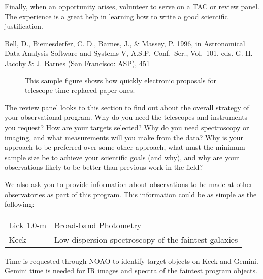 Finally, when an opportunity arises, volunteer to serve on
a TAC or review panel.  The experience is a great help in
learning how to write a good scientific justification.

\begin{references}
 Bell, D., Biemesderfer, C. D., Barnes, J., \& Massey, P. 1996, in
Astronomical Data Analysis Software and Systems V, A.S.P.\ Conf.\ Ser.,
Vol.\ 101, eds. G. H. Jacoby \& J. Barnes (San Francisco: ASP), 451
\end{references}

\begin{figure}[hbt]
\caption{This sample figure shows how quickly electronic proposals
for telescope time replaced paper ones.}
\end{figure}

\clearpage


%

%

\expdesign
The review panel looks to this section to find out about the overall
strategy of your observational program.  Why do you need the telescopes
and instruments you request? How are your targets selected?
Why do you need spectroscopy or imaging, and what measurements will
you make from the data?  Why is your approach to be preferred over
some other approach, what must the minimum sample size be to achieve
your scientific goals (and why), and why are your
observations likely to be better than previous work in the field?

We also ask you to provide information about observations to be made
at other observatories as part of this program.  This information could
be as simple as the following:

{\bf
\begin{tabular}{ll}
Lick 1.0-m &  Broad-band Photometry \\
Keck  & Low dispersion spectroscopy of the faintest galaxies \\
\end{tabular}

Time is requested through NOAO to identify target objects on
Keck and Gemini.  Gemini time is needed for IR images and spectra
of the faintest program objects.
}



